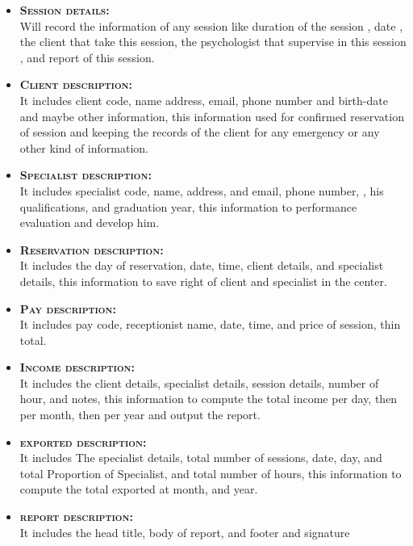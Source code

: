 \documentclass[../Psychological_system_web_application.tex]{subfiles}
\begin{document}
					\begin{itemize}
						\item
							\textbf{\textsc{\color{red}Session details:}}\\
							Will record the information of any session  like duration of the session , date , the client that take this session, the psychologist that supervise in this session , and report of this session.
						\item
							\textbf{\textsc{\color{red}Client description:}}\\
							It includes client code, name address, email, phone number and birth-date and maybe other information, this information used for confirmed reservation of session and keeping the records of the client for any emergency or any other kind of information.
						\item
							\textbf{\textsc{\color{red}Specialist description:}}\\
							It includes specialist code, name, address, and email, phone number,  , his qualifications, and graduation year, this information to performance evaluation and develop him.
						\item
							\textbf{\textsc{\color{red}Reservation description:}}\\	
							It includes the day of reservation, date, time, client details, and specialist details, this information to save right of client and specialist in the center.
						\item
							\textbf{\textsc{\color{red}Pay description:}}\\
							It includes pay code, receptionist name, date, time, and price of session, thin total.
						\item
							\textbf{\textsc{\color{red}Income description:}}\\
							It includes the client details, specialist details, session details, number of hour, and notes, this information to compute the total income per day, then per month, then per year and output the report.
						\item
							\textbf{\textsc{\color{red}exported description:}}\\
							It includes The specialist details, total number of sessions, date, day, and total Proportion of Specialist, and total number of hours, this information to compute the total exported at month, and year.  
						\item
							\textbf{\textsc{\color{red}report description:}}\\
							It includes the head title, body of report, and footer and signature 
					\end{itemize}
\end{document}
